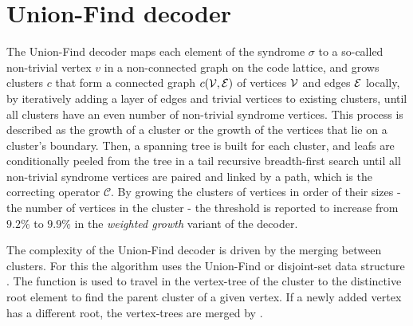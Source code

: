 \section{Union-Find decoder}\label{sec:unionfind}

The Union-Find decoder \cite{delfosse2017linear, delfosse2017almost} maps each element of the syndrome $\sigma$ to a so-called non-trivial vertex $v$ in a non-connected graph on the code lattice, and grows clusters $c$ that form a connected graph $c(\mathcal{V}, \mathcal{E})$ of vertices $\mathcal{V}$ and edges $\mathcal{E}$ locally, by iteratively adding a layer of edges and trivial vertices to existing clusters, until all clusters have an even number of non-trivial syndrome vertices. This process is described as the growth of a cluster or the growth of the vertices that lie on a cluster's boundary. Then, a spanning tree is built for each cluster, and leafs are conditionally peeled from the tree in a tail recursive breadth-first search until all non-trivial syndrome vertices are paired and linked by a path, which is the correcting operator $\mathcal{C}$. By growing the clusters of vertices in order of their sizes - the number of vertices in the cluster - the threshold is reported to increase from $9.2\%$ to $9.9\%$ in the \emph{weighted growth} variant of the decoder.

The complexity of the Union-Find decoder is driven by the merging between clusters. For this the algorithm uses the Union-Find or disjoint-set data structure \cite{tarjan1975efficiency}. The function  is used to travel in the vertex-tree of the cluster to the distinctive root element to find the parent cluster of a given vertex. If a newly added vertex has a different root, the vertex-trees are merged by . 